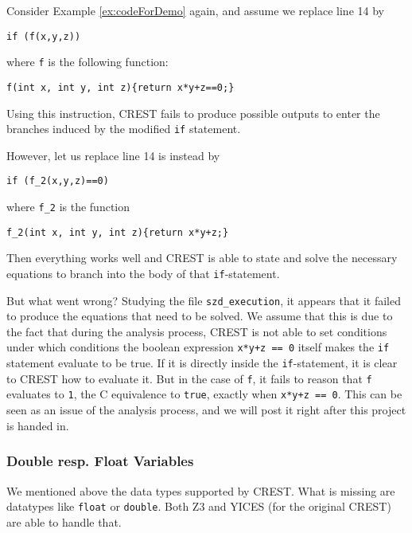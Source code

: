\documentclass[oribibl]{llncs}
\begin{document}
Consider Example \ref{ex:codeForDemo} again, and assume we replace
line 14 by
\begin{verbatim}
if (f(x,y,z))
\end{verbatim}
where \texttt{f} is the following function:
\begin{verbatim}
f(int x, int y, int z){return x*y+z==0;}
\end{verbatim}

Using this instruction, \textsc{CREST} fails to produce possible
outputs to enter the branches induced by the modified \texttt{if}
statement.

However, let us replace line 14 is instead by

\begin{verbatim}
if (f_2(x,y,z)==0)
\end{verbatim}

where \texttt{f\_2} is the function
\begin{verbatim}
f_2(int x, int y, int z){return x*y+z;}
\end{verbatim}

Then everything works well and \textsc{CREST} is able to state and
solve the necessary equations to branch into the body of that \texttt{if}-statement.

But what went wrong? Studying the file \texttt{szd\_execution}, it
appears that it failed to produce the equations that need to be
solved. We assume that this is due to the fact that during the
analysis process, \textsc{CREST} is not able to set conditions under
which conditions the boolean expression \texttt{x*y+z == 0} itself makes the
\texttt{if} statement evaluate to be true. If it is directly inside
the \texttt{if}-statement, it is clear to \textsc{CREST} how to
evaluate it. But in the case of \texttt{f}, it fails to reason that
\texttt{f} evaluates to
\texttt{1}, the \textsc{C} equivalence to \texttt{true}, exactly when \texttt{x*y+z == 0}.
This can be seen as an issue of the analysis process, and we will post
it right after this project is handed in.

\subsubsection{Double resp. Float Variables}
\label{sbsbsctn:dblrespfloat}

We mentioned above the data types supported by \textsc{CREST}. What is
missing are datatypes like \texttt{float} or \texttt{double}. Both
\textsc{Z3} and \textsc{YICES} (for the original \textsc{CREST}) are
able to handle that.
\end{document}
